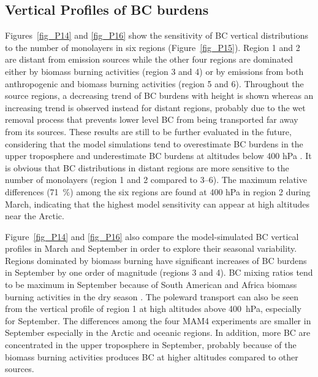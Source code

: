 \documentclass[12pt, fullpage]{uiucthesis2009}
\begin{document}
	\subsection{Vertical Profiles of BC burdens}\label{sec_8}
	Figures~\ref{fig_P14} and \ref{fig_P16} show the sensitivity of BC vertical distributions to the number of monolayers in six regions (Figure~\ref{fig_P15}). Region 1 and 2 are distant from emission sources while the other four regions are dominated either by biomass burning activities (region 3 and 4) or by emissions from both anthropogenic and biomass burning activities (region 5 and 6). Throughout the source regions, a decreasing trend of BC burdens with height is shown whereas an increasing trend is observed instead for distant regions, probably due to the wet removal process that prevents lower level BC from being transported far away from its sources. These results are still to be further evaluated in the future, considering that the model simulations tend to overestimate BC burdens in the upper troposphere and underestimate BC burdens at altitudes below 400 hPa \citep{Liu2016}. It is obvious that BC distributions in distant regions are more sensitive to the number of monolayers (region 1 and 2 compared to 3--6). The maximum relative differences (71~$\%$) among the six regions are found at 400 hPa in region 2 during March, indicating that the highest model sensitivity can appear at high altitudes near the Arctic. 
	
	Figure~\ref{fig_P14} and \ref{fig_P16} also compare the model-simulated BC vertical profiles in March and September in order to explore their seasonal variability. Regions dominated by biomass burning have significant increases of BC burdens in September by one order of magnitude (regions 3 and 4). BC mixing ratios tend to be maximum in September because of South American and Africa biomass burning activities in the dry season \citep{Liu2016}. The poleward transport can also be seen from the vertical profile of region 1 at high altitudes above 400~hPa, especially for September. The differences among the four MAM4 experiments are smaller in September especially in the Arctic and oceanic regions. In addition, more BC are concentrated in the upper troposphere in September, probably because of the biomass burning activities produces BC at higher altitudes compared to other sources. 
	
\end{document}
